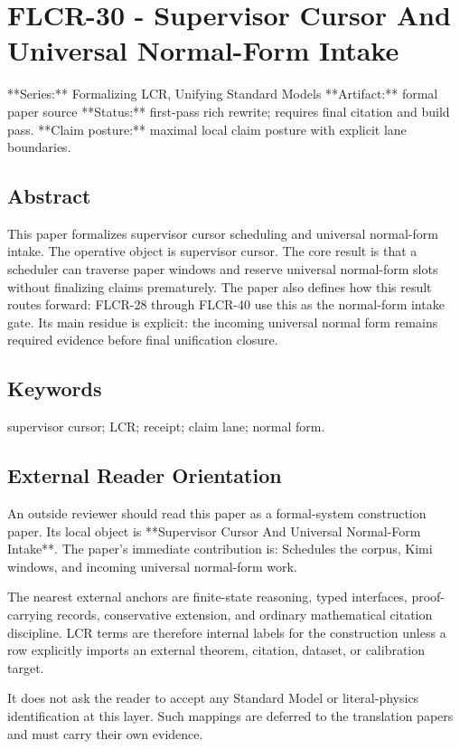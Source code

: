 \documentclass[11pt]{article}
\begin{document}
\section*{FLCR-30 - Supervisor Cursor And Universal Normal-Form Intake}

**Series:** Formalizing LCR, Unifying Standard Models
**Artifact:** formal paper source
**Status:** first-pass rich rewrite; requires final citation and build pass.
**Claim posture:** maximal local claim posture with explicit lane boundaries.

\subsection*{Abstract}

This paper formalizes supervisor cursor scheduling and universal normal-form intake. The operative object is supervisor cursor. The core result is that a scheduler can traverse paper windows and reserve universal normal-form slots without finalizing claims prematurely. The paper also defines how this result routes forward: FLCR-28 through FLCR-40 use this as the normal-form intake gate. Its main residue is explicit: the incoming universal normal form remains required evidence before final unification closure.

\subsection*{Keywords}

supervisor cursor; LCR; receipt; claim lane; normal form.

\subsection*{External Reader Orientation}

An outside reviewer should read this paper as a formal-system construction paper. Its local object is **Supervisor Cursor And Universal Normal-Form Intake**. The paper's immediate contribution is: Schedules the corpus, Kimi windows, and incoming universal normal-form work.

The nearest external anchors are finite-state reasoning, typed interfaces, proof-carrying records, conservative extension, and ordinary mathematical citation discipline. LCR terms are therefore internal labels for the construction unless a row explicitly imports an external theorem, citation, dataset, or calibration target.

It does not ask the reader to accept any Standard Model or literal-physics identification at this layer. Such mappings are deferred to the translation papers and must carry their own evidence.
\end{document}
